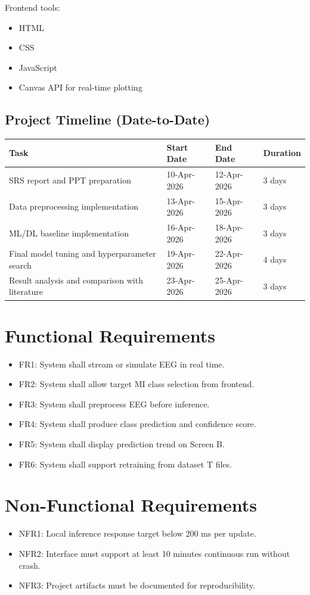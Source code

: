 \documentclass[12pt,a4paper]{article}
\begin{document}
Frontend tools:
\begin{itemize}[leftmargin=1.5em]
  \item HTML
  \item CSS
  \item JavaScript
  \item Canvas API for real-time plotting
\end{itemize}

\subsection{Project Timeline (Date-to-Date)}
\begin{longtable}{p{}p{}p{}p{}}
\toprule
\textbf{Task} & \textbf{Start Date} & \textbf{End Date} & \textbf{Duration} \\
\midrule
SRS report and PPT preparation & 10-Apr-2026 & 12-Apr-2026 & 3 days \\
Data preprocessing implementation & 13-Apr-2026 & 15-Apr-2026 & 3 days \\
ML/DL baseline implementation & 16-Apr-2026 & 18-Apr-2026 & 3 days \\
Final model tuning and hyperparameter search & 19-Apr-2026 & 22-Apr-2026 & 4 days \\
Result analysis and comparison with literature & 23-Apr-2026 & 25-Apr-2026 & 3 days \\
\bottomrule
\end{longtable}

\section{Functional Requirements}
\begin{itemize}[leftmargin=1.5em]
  \item FR1: System shall stream or simulate EEG in real time.
  \item FR2: System shall allow target MI class selection from frontend.
  \item FR3: System shall preprocess EEG before inference.
  \item FR4: System shall produce class prediction and confidence score.
  \item FR5: System shall display prediction trend on Screen B.
  \item FR6: System shall support retraining from dataset T files.
\end{itemize}

\section{Non-Functional Requirements}
\begin{itemize}[leftmargin=1.5em]
  \item NFR1: Local inference response target below 200 ms per update.
  \item NFR2: Interface must support at least 10 minutes continuous run without crash.
  \item NFR3: Project artifacts must be documented for reproducibility.
\end{itemize}
\end{document}
